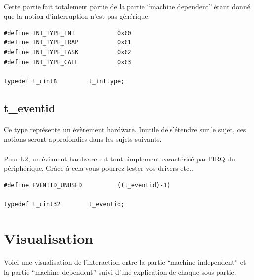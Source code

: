 \documentclass[10pt,a4wide]{article}
\begin{document}
\paragraph{}

Cette partie fait totalement partie de la partie ``machine dependent''
\'etant donn\'e que la notion d'interruption n'est pas g\'en\'erique.

\begin{verbatim}
#define INT_TYPE_INT            0x00
#define INT_TYPE_TRAP           0x01
#define INT_TYPE_TASK           0x02
#define INT_TYPE_CALL           0x03

typedef t_uint8         t_inttype;
\end{verbatim}

\subsection{t\_eventid}

\paragraph{}

Ce type repr\'esente un \'ev\`enement hardware. Inutile de s'\'etendre sur
le sujet, ces notions seront approfondies dans les sujets suivants.

\paragraph{}

Pour k2, un \'ev\`ement hardware est tout simplement caract\'eris\'e par
l'IRQ du p\'eriph\'erique. Gr\^ace \`a cela vous pourrez tester vos
drivers etc..

\begin{verbatim}
#define EVENTID_UNUSED          ((t_eventid)-1)

typedef t_uint32        t_eventid;
\end{verbatim}

\newpage

\section{Visualisation}

\paragraph{}

Voici une visualisation de l'interaction entre la partie
``machine independent'' et la partie ``machine dependent'' suivi
d'une explication de chaque sous partie.
\end{document}
